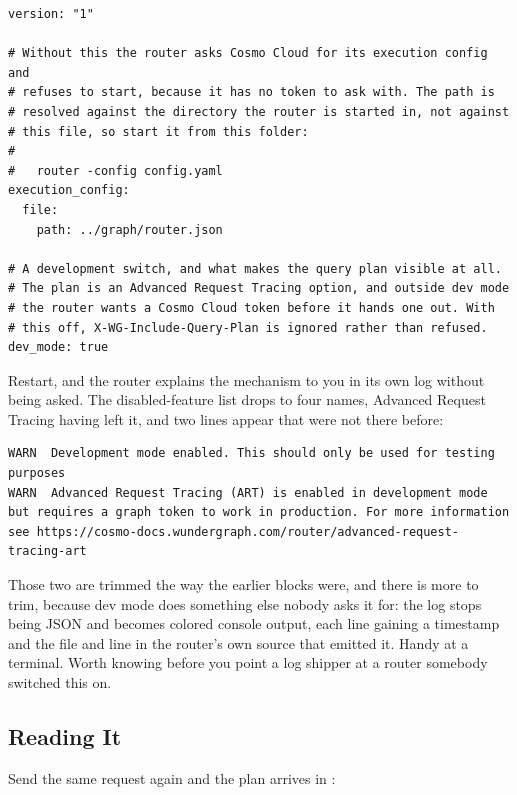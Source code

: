 %
\begin{verbatim}
version: "1"

# Without this the router asks Cosmo Cloud for its execution config and
# refuses to start, because it has no token to ask with. The path is
# resolved against the directory the router is started in, not against
# this file, so start it from this folder:
#
#   router -config config.yaml
execution_config:
  file:
    path: ../graph/router.json

# A development switch, and what makes the query plan visible at all.
# The plan is an Advanced Request Tracing option, and outside dev mode
# the router wants a Cosmo Cloud token before it hands one out. With
# this off, X-WG-Include-Query-Plan is ignored rather than refused.
dev_mode: true
\end{verbatim}

%
Restart, and the router explains the mechanism to you in its own log without
being asked. The disabled-feature list drops to four names, Advanced Request
Tracing having left it, and two lines appear that were not there before:

\begin{verbatim}
WARN  Development mode enabled. This should only be used for testing purposes
WARN  Advanced Request Tracing (ART) is enabled in development mode but requires a graph token to work in production. For more information see https://cosmo-docs.wundergraph.com/router/advanced-request-tracing-art
\end{verbatim}

%
Those two are trimmed the way the earlier blocks were, and there is more to
trim, because dev mode does something else nobody asks it for: the log stops
being JSON and becomes colored console output, each line gaining a timestamp
and the file and line in the router's own source that emitted it. Handy at a
terminal. Worth knowing before you point a log shipper at a router somebody
switched this on.

\subsection{Reading It}

%
Send the same request again and the plan arrives in :


